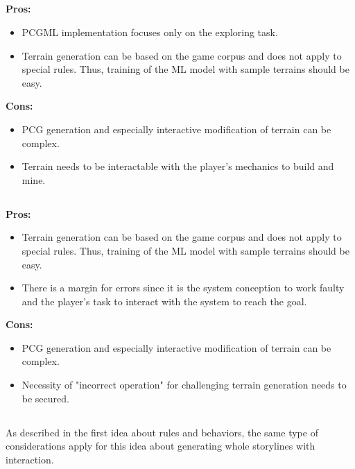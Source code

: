 \documentclass[MGS,Master,english]{twbook}%
\begin{document}
\subsection{}
\textbf{Pros:}
\begin{itemize}
	\item PCGML implementation focuses only on the exploring task.
	\item Terrain generation can be based on the game corpus and does not apply to special rules. Thus, training of the ML model with sample terrains should be easy.
\end{itemize}
\textbf{Cons:}
\begin{itemize}
	\item PCG generation and especially interactive modification of terrain can be complex.
	\item Terrain needs to be interactable with the player's mechanics to build and mine.
\end{itemize}

\subsection{}
\textbf{Pros:}
\begin{itemize}
	\item Terrain generation can be based on the game corpus and does not apply to special rules. Thus, training of the ML model with sample terrains should be easy.
	\item There is a margin for errors since it is the system conception to work faulty and the player's task to interact with the system to reach the goal. 
\end{itemize}
\textbf{Cons:}
\begin{itemize}
	\item PCG generation and especially interactive modification of terrain can be complex.
	\item Necessity of "incorrect operation" for challenging terrain generation needs to be secured.
\end{itemize}

\subsection{}
As described in the first idea about rules and behaviors, the same type of considerations apply for this idea about generating whole storylines with interaction.
\end{document}

